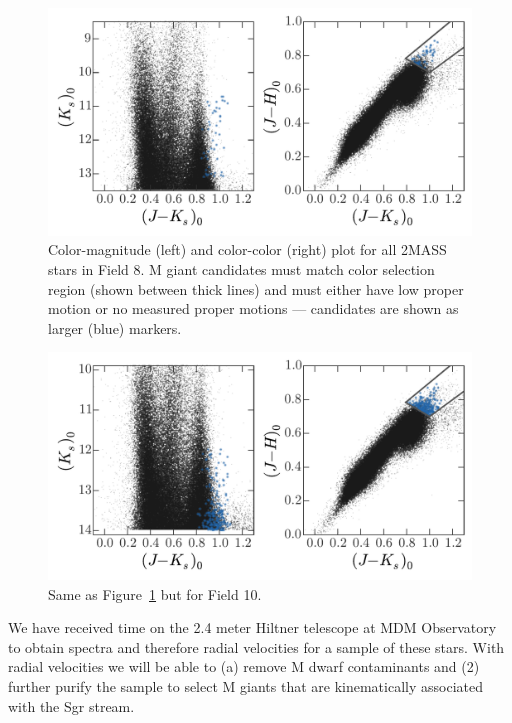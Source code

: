 \documentclass[letterpaper,12pt,preprint]{hack_aastex}
\begin{document}
\begin{figure}[p]
\begin{center}
\includegraphics[width=\textwidth]{fig1.pdf}
\caption{Color-magnitude (left) and color-color (right) plot for all 2MASS stars in Field 8. M giant candidates must match color selection region (shown between thick lines) and must either have low proper motion or no measured proper motions --- candidates are shown as larger (blue) markers. }
\label{fig:field8}
\end{center}
\end{figure}

\begin{figure}[p]
\begin{center}
\includegraphics[width=\textwidth]{fig2.pdf}
\caption{Same as Figure~\ref{fig:field8} but for Field 10. }
\label{fig:field10}
\end{center}
\end{figure}

We have received time on the 2.4 meter Hiltner telescope at MDM Observatory to obtain spectra and therefore radial velocities for a sample of these stars. With radial velocities we will be able to (a) remove M dwarf contaminants and (2) further purify the sample to select M giants that are kinematically associated with the Sgr stream.
\end{document}
